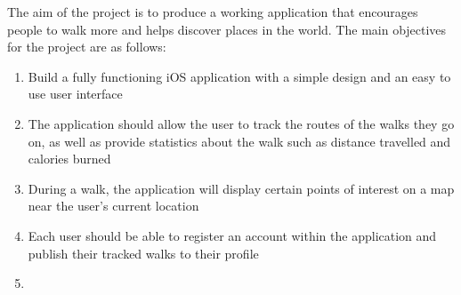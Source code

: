 \bigskip

The aim of the project is to produce a working application that encourages people to walk more and helps discover places in the world. The main objectives for the project are as follows:

\begin{enumerate}[label=\textbf{Obj \arabic*}]
    \item Build a fully functioning iOS application with a simple design and an easy to use user interface
    \item The application should allow the user to track the routes of the walks they go on, as well as provide statistics about the walk such as distance travelled and calories burned
    \item During a walk, the application will display certain points of interest on a map near the user's current location
    \item Each user should be able to register an account within the application and publish their tracked walks to their profile
    \item 
\end{enumerate}






